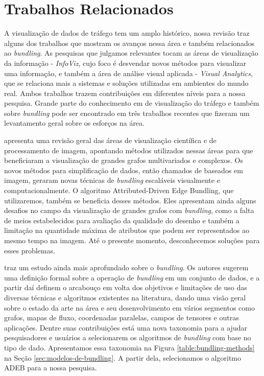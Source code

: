 \chapter{Trabalhos Relacionados}
\label{cap:trabalhos-relacionados}

  A visualização de dados de tráfego tem um amplo histórico, nossa revisão traz
alguns dos trabalhos que mostram os avanços nessa área e também relacionados ao
\emph{bundling}. As pesquisas que julgamos relevantes tocam as áreas de
visualização da informação - \emph{InfoViz}, cujo foco é desvendar novos
métodos para visualizar uma informação, e também a área de análise visual
aplicada - \emph{Visual Analytics}, que se relaciona mais a sistemas e soluções
utilizadas em ambientes do mundo real. Ambos trabalhos trazem contribuições em
diferentes níveis para a nossa pesquisa. Grande parte do conhecimento em
de visualização do tráfego e também sobre \emph{bundling} pode ser encontrado em três
trabalhos recentes que fizeram um levantamento geral sobre os esforços na área.


  \citet{Telea2018} apresenta uma revisão geral das áreas de visualização
científica e de processamento de imagem, apontando métodos utilizados nessas
áreas para que beneficiaram a visualização de grandes grafos multivariados e
complexos. Os novos métodos para simplificação de dados, então chamados de
baseados em imagem, geraram novas técnicas de \emph{bundling} escaláveis
visualmente e computacionalmente.  O algoritmo Attributed-Driven Edge Bundling,
que utilizaremos, também se beneficia desses métodos. Eles apresentam ainda
alguns desafios no campo da visualização de grandes grafos com \emph{bundling},
como a falta de meios estabelecidos para avaliação da qualidade do desenho e
também a limitação na quantidade máxima de atributos que podem ser
representados ao mesmo tempo na imagem. Até o presente momento, desconhecemos
soluções para esses problemas.

  \citet{Lhuillier2017} traz um estudo ainda mais aprofundado sobre o
\emph{bundling}. Os autores sugerem uma definição formal sobre a operação de
\emph{bundling} em um conjunto de dados, e a partir daí definem o arcabouço em
volta dos objetivos e limitações de uso das diversas técnicas e algoritmos
existentes na literatura, dando uma visão geral sobre o estado da arte na área
e seu desenvolvimento em vários segmentos como grafos, mapas de fluxo,
coordenadas paralelas, campos de tensores e outras aplicações. Dentre suas
contribuições está uma nova taxonomia para a ajudar pesquisadores e usuários a
selecionarem os algoritmos de \emph{bundling} com base no tipo de dado.
Apresentamos essa taxonomia na Figura \ref{table:bundling-methods} na Seção
\ref{sec:modelos-de-bundling}. A partir dela, selecionamos o algoritmo ADEB
para a nossa pesquisa.

